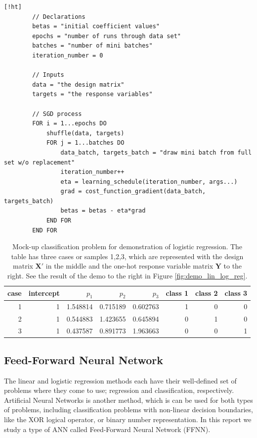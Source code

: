 \documentclass[]{article}
\begin{document}
	\begin{lstlisting}[caption={Stochastic Gradient Descent algorithm. Cost function gradients and learning schedules may be defined independently of the implementation of SGD. This implementation runs for \lstinline|epochs*batches| iterations, and does not sense if or when it converges.},label={lst:sgd}] [!ht]
		// Declarations
		betas = "initial coefficient values"
		epochs = "number of runs through data set"
		batches = "number of mini batches"
		iteration_number = 0
		
		// Inputs
		data = "the design matrix"
		targets = "the response variables"
	
		// SGD process	
		FOR i = 1...epochs DO
			shuffle(data, targets)
			FOR j = 1...batches DO
				data_batch, targets_batch = "draw mini batch from full set w/o replacement"
				iteration_number++
				eta = learning_schedule(iteration_number, args...)
				grad = cost_function_gradient(data_batch, targets_batch)
				betas = betas - eta*grad
			END FOR
		END FOR
	\end{lstlisting}

\begin{table}[!ht]
	\caption{Mock-up classification problem for demonstration of logistic regression. The table has three cases or samples 1,2,3, which are represented with the design matrix $\mathbf{X}'$ in the middle and the one-hot response variable matrix $\mathbf{Y}$ to the right. See the result of the demo to the right in Figure \ref{fig:demo_lin_log_reg}.}
	\label{tab:logreg-demo}
	\begin{center}
		\begin{tabular}{r|rrrr|rrr}
			\toprule
			case &  intercept &     $p_1$ &     $p_2$ &     $p_3$ &  class 1 &  class 2 &  class 3 \\
			\midrule
			1 &          1 &  1.548814 &  0.715189 &  0.602763 &        1 &        0 &        0 \\
			2 &          1 &  0.544883 &  1.423655 &  0.645894 &        0 &        1 &        0 \\
			3 &          1 &  0.437587 &  0.891773 &  1.963663 &        0 &        0 &        1 \\
			\bottomrule
		\end{tabular}
	\end{center}
\end{table}


\subsection{Feed-Forward Neural Network}
The linear and logistic regression methods each have their well-defined set of problems where they come to use; regression and classification, respectively. Artificial Neural Networks is another method, which is can be used for both types of problems, including classification problems with non-linear decision boundaries, like the XOR logical operator, or binary number representation. In this report we study a type of ANN called Feed-Forward Neural Network (FFNN).
\end{document}
